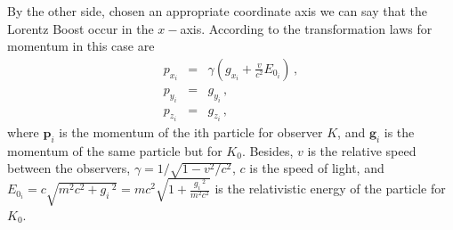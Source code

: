 \documentclass[11pt]{article}
\theoremstyle{definition}     %
\theoremstyle{definition}     %
\begin{document}
By the other side, chosen an appropriate coordinate axis we can say that the Lorentz Boost occur in the $x-$axis. According to \cite{Landau} the transformation laws for momentum in this case are 
\begin{eqnarray}
	p_{x_i} &=& \gamma\left(g_{x_i} + \frac{v}{c^2}E_{0_i}\right) \,, \\
	p_{y_i} &=& g_{y_i} \,, \\
	p_{z_i} &=& g_{z_i} \,,
\end{eqnarray}
where $\mathbf{p}_i$ is the momentum of the ith particle for observer $K$, and $\mathbf{g}_i$ is the momentum of the same particle but for $K_0$. Besides, $v$ is the relative speed between the observers, $\gamma=1/\sqrt{1-v^2/c^2}$, $c$ is the speed of light, and $E_{0_i}=c\sqrt{m^2c^2+g_i\,^2}=mc^2\sqrt{1+\frac{g_i\,^2}{m^2c^2}}$ is the relativistic energy of the particle for $K_0$.
\end{document}
